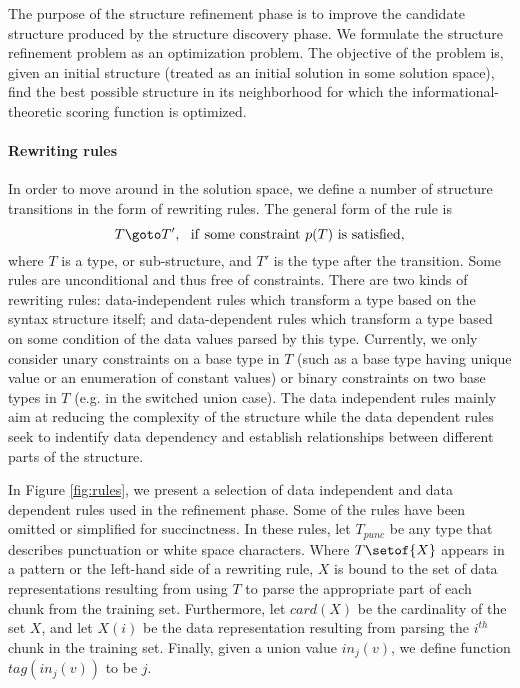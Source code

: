 The purpose of the structure refinement phase is to improve
the candidate structure produced by the structure discovery phase. We
formulate the structure refinement problem as an optimization problem. The
objective of the problem is, given an initial structure (treated as
an initial solution in some solution space), find the best possible structure
in its neighborhood for which the informational-theoretic scoring function
is optimized.

\paragraph*{Rewriting rules}
In order to move around in the solution space, we define a number of structure
transitions in the form of rewriting rules. The general form of the rule is
\[T \goto T', ~~ {\rm if~ some~ constraint~} p(T)~ {\rm is~ satisfied,}\]
where $T$ is a type, or sub-structure, and $T'$ is the type after the
transition.  Some rules are unconditional and thus free of constraints.
There are two kinds of rewriting rules: data-independent rules which
transform a type based on the syntax structure itself; and data-dependent
rules which transform a type based on some condition of the data values
parsed by this type. Currently, we only consider unary constraints on a base
type in $T$ (such as a base type having unique value or an enumeration of constant
values) or binary constraints on two base types in $T$ (e.g. in the switched
union case). The data independent rules mainly aim at reducing the complexity
of the structure while the data dependent rules seek to indentify data
dependency and establish relationships between different parts 
of the structure.

In Figure \ref{fig:rules}, we present a selection of
data independent and data dependent rules used in the refinement phase.
Some of the rules have been omitted or simplified for succinctness.
In these rules,
let $T_{punc}$ be any type that describes punctuation or white space characters.
Where $T\setof{X}$ appears in a pattern or the left-hand side of a rewriting
rule, $X$ is bound to the set of data representations resulting
from using $T$ to parse the appropriate part of each chunk from the training
set. Furthermore, let $card(X)$ be the cardinality of the set $X$, 
and let $X(i)$ be the data representation resulting
from parsing the $i^{th}$ chunk in the training set. Finally, given a union
value $in_j(v)$, we define function $tag(in_j(v))$ to be $j$.

